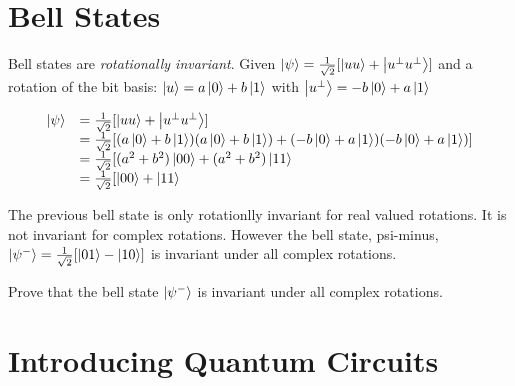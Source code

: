 \section{Bell States}


Bell states are \textit{rotationally invariant}.
Given $\left|\psi\right\rangle = \frac{1}{\sqrt{2}} [\left|uu\right\rangle + \left|u^{\perp}u^{\perp}\right\rangle]$ 
and a rotation of the bit basis:
$\left|u\right\rangle = a\left|0\right\rangle + b\left|1\right\rangle$ with $\left|u^{\perp}\right\rangle = -b\left|0\right\rangle + a\left|1\right\rangle$




\[ \begin{array}{ll}
\left|\psi\right\rangle
& =
\frac{1}{\sqrt{2}} [\left|uu\right\rangle + \left|u^{\perp}u^{\perp}\right\rangle] \\
& =
\frac{1}{\sqrt{2}} [(a\left|0\right\rangle + b\left|1\right\rangle)(a\left|0\right\rangle + b\left|1\right\rangle) 
+ (-b\left|0\right\rangle + a\left|1\right\rangle)(-b\left|0\right\rangle + a\left|1\right\rangle)]  \\ 
& =
\frac{1}{\sqrt{2}} [(a^2 + b^2)\left|00\right\rangle + (a^2 + b^2)\left|11\right\rangle \\ 
& =
\frac{1}{\sqrt{2}} [\left|00\right\rangle + \left|11\right\rangle \\ 
\end{array}\] 

\frmrule

The previous bell state is only rotationlly invariant for real valued rotations. 
It is not invariant for complex rotations. However the bell state, 
psi-minus, $\left|\psi^{-}\right\rangle = \frac{1}{\sqrt{2}} [\left|01\right\rangle - \left|10\right\rangle]$
is invariant under all complex rotations.

\begin{example}
Prove that the bell state $\left|\psi^{-}\right\rangle$ is invariant under all complex rotations.
\end{example}


\section{Introducing Quantum Circuits}




